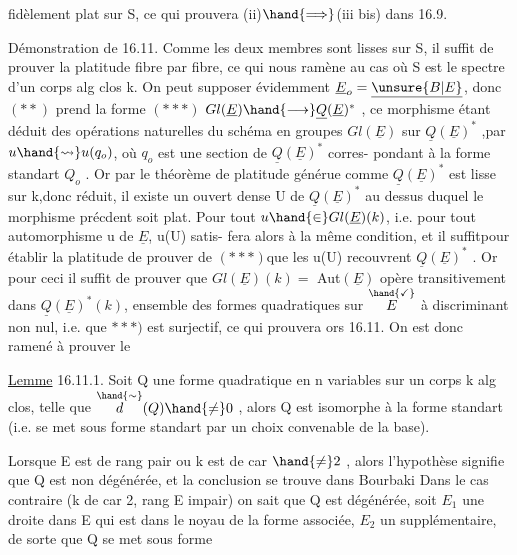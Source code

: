 
fidèlement plat sur S, ce qui prouvera  (ii)$\hand{\Longrightarrow}$(iii bis) dans  16.9.

Démonstration de 16.11.  Comme les deux membres sont lisses sur S,
il suffit de prouver la platitude fibre par fibre, ce qui nous ramène au
cas où S est le spectre d'un corps alg clos k.  On peut  supposer
évidemment $\underline{E}_o=\underline{\unsure{B|E}}$, donc $(**)$ prend la forme
$(***)$   $Gl(\underline{E})\hand{\longrightarrow}\underline{Q}(\underline{E})^*$ ,
ce morphisme étant déduit des opérations naturelles du schéma en groupes
$Gl(\underline{E})$ sur $\underline{Q}(\underline{E})^*$ ,par $u\hand{\rightsquigarrow} u(q_o)$, où $q_o$ est une section de $\underline{Q}(\underline{E})^*$ corres-%
pondant à la forme standart $Q_o$ . Or par le théorème de platitude générue\hand{,}
comme $\underline{Q}(\underline{E})^*$ est lisse sur k,donc réduit, il existe un ouvert dense U de
$\underline{Q}(\underline{E})^*$ au dessus duquel le morphisme précdent soit plat.  Pour tout 
$u\hand{\in}Gl(\underline{E})(k)$, i.e. pour tout automorphisme u de $\underline{E}$, u(U) satis-%
fera alors à la même condition, et il suffit\hand{$\unsure{\leftarrow}$}pour établir la platitude de prouver\hand{,} \hand{$\downarrow$}
de $(***)$\hand{,}que les u(U) recouvrent $\underline{Q}(\underline{E})^*$ . Or pour ceci il suffit de prouver
que $Gl(\underline{E})(k)=$ Aut$(\underline{E})$ opère transitivement dans $\underline{Q}(\underline{E})^*(k)$, ensemble des
formes quadratiques  sur $\overset{\hand{\checkmark}}{E}$ à discriminant non nul,  i.e. que
\unsure{}$***)$ est surjectif, ce qui prouvera ors 16.11.  On est donc ramené à
prouver le

\uline{Lemme} 16.11.1.  Soit Q une forme quadratique en n variables sur un corps k
alg clos, telle que $\overset{\hand{\sim}}{d}(Q)\hand{\neq} 0$ , alors Q est isomorphe à la forme standart
(i.e. se met sous forme standart par un choix convenable de la base).

Lorsque E est de rang pair ou k est de car $\hand{\neq} 2$ , alors l'hypothèse
signifie que Q est non dégénérée, et la conclusion se trouve dans Bourbaki
Dans le cas contraire (k de car 2,  rang E impair)  on sait que Q est
dégénérée,  soit $E_1$ une droite dans E qui est dans le noyau de la
forme associée, $E_2$ un supplémentaire, de sorte que Q se met sous forme


